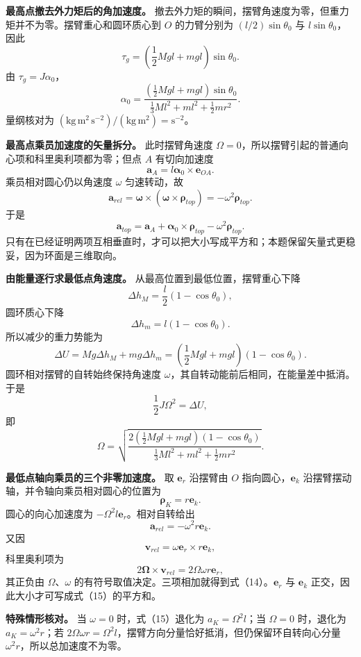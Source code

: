 \documentclass[12pt,a4paper,UTF8]{ctexart}
\begin{document}
\textbf{最高点撤去外力矩后的角加速度。}
撤去外力矩的瞬间，摆臂角速度为零，但重力矩并不为零。摆臂重心和圆环质心到
\(O\) 的力臂分别为 \((l/2)\sin\theta_0\) 与 \(l\sin\theta_0\)，因此 \[
\tau_g=\left(\frac12Mgl+mgl\right)\sin\theta_0.
\] 由 \(\tau_g=J\alpha_0\)， \[
\alpha_0=
\frac{\left(\frac12Mgl+mgl\right)\sin\theta_0}
{\frac13Ml^2+ml^2+\frac12mr^2}.
\] 量纲核对为
\((\mathrm{kg\,m^2\,s^{-2}})/(\mathrm{kg\,m^2})=\mathrm{s^{-2}}\)。

\textbf{最高点乘员加速度的矢量拆分。} 此时摆臂角速度
\(\Omega=0\)，所以摆臂引起的普通向心项和科里奥利项都为零；但点 \(A\)
有切向加速度 \[
\boldsymbol a_A=l\boldsymbol\alpha_0\times\boldsymbol e_{OA}.
\] 乘员相对圆心仍以角速度 \(\omega\) 匀速转动，故 \[
\boldsymbol a_{rel}
=\boldsymbol\omega\times
(\boldsymbol\omega\times\boldsymbol\rho_{top})
=-\omega^2\boldsymbol\rho_{top}.
\] 于是 \[
\boldsymbol a_{top}=\boldsymbol a_A+\boldsymbol\alpha_0\times\boldsymbol\rho_{top}-\omega^2\boldsymbol\rho_{top}.
\]
只有在已经证明两项互相垂直时，才可以把大小写成平方和；本题保留矢量式更稳妥，因为环面是三维取向。

\textbf{由能量逐行求最低点角速度。} 从最高位置到最低位置，摆臂重心下降
\[
\Delta h_M=\frac l2(1-\cos\theta_0),
\] 圆环质心下降 \[
\Delta h_m=l(1-\cos\theta_0).
\] 所以减少的重力势能为 \[
\Delta U
=Mg\Delta h_M+mg\Delta h_m
=\left(\frac12Mgl+mgl\right)(1-\cos\theta_0).
\] 圆环相对摆臂的自转始终保持角速度
\(\omega\)，其自转动能前后相同，在能量差中抵消。于是 \[
\frac12J\Omega^2=\Delta U,
\] 即 \[
\Omega=\sqrt{
\frac{2\left(\frac12Mgl+mgl\right)(1-\cos\theta_0)}
{\frac13Ml^2+ml^2+\frac12mr^2}}
.
\]

\textbf{最低点轴向乘员的三个非零加速度。} 取 \(\boldsymbol e_r\)
沿摆臂由 \(O\) 指向圆心，\(\boldsymbol e_k\)
沿摆臂摆动轴，并令轴向乘员相对圆心的位置为 \[
\boldsymbol\rho_K=r\boldsymbol e_k.
\] 圆心的向心加速度为 \(-\Omega^2l\boldsymbol e_r\)。相对自转给出 \[
\boldsymbol a_{rel}=-\omega^2r\boldsymbol e_k.
\] 又因 \[
\boldsymbol v_{rel}
=\omega\boldsymbol e_r\times r\boldsymbol e_k,
\] 科里奥利项为 \[
2\boldsymbol\Omega\times\boldsymbol v_{rel}
=2\Omega\omega r\boldsymbol e_r,
\] 其正负由 \(\Omega\)、\(\omega\)
的有符号取值决定。三项相加就得到式（14）。\(\boldsymbol e_r\) 与
\(\boldsymbol e_k\) 正交，因此大小才可写成式（15）的平方和。

\textbf{特殊情形核对。} 当 \(\omega=0\) 时，式（15）退化为
\(a_K=\Omega^2l\)；当 \(\Omega=0\) 时，退化为 \(a_K=\omega^2r\)；若
\(2\Omega\omega r=\Omega^2l\)，摆臂方向分量恰好抵消，但仍保留环自转向心分量
\(\omega^2r\)，所以总加速度不为零。
\end{document}
